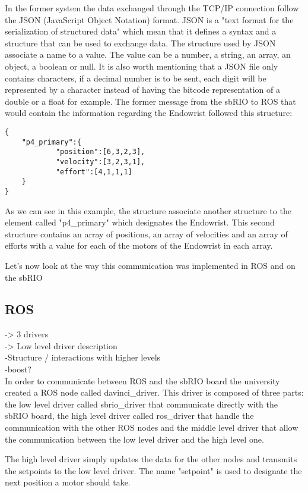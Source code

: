 In the former system the data exchanged through the TCP/IP connection follow the JSON (JavaScript Object Notation) format. JSON is a "text format for the serialization of structured data"\cite{JSON} which mean that it defines a syntax and a structure that can be used to exchange data. The structure used by JSON associate a name to a value. The value can be a number, a string, an array, an object, a boolean or null. It is also worth mentioning that a JSON file only contains characters, if a decimal number is to be sent, each digit will be represented by a character instead of having the bitcode representation of a double or a float for example. The former message from the sbRIO to ROS that would contain the information regarding the Endowrist followed this structure:

\begin{verbatim}
{
	"p4_primary":{
			"position":[6,3,2,3],
			"velocity":[3,2,3,1],
			"effort":[4,1,1,1]
	}
}
\end{verbatim}

As we can see in this example, the structure associate another structure to the element called "p4\_primary" which designates the Endowrist. This second structure contains an array of positions, an array of velocities and an array of efforts with a value for each of the motors of the Endowrist in each array.

Let's now look at the way this communication was implemented in ROS and on the sbRIO
\subsection{ROS}
-> 3 drivers\\
-> Low level driver description\\
	-Structure / interactions with higher levels\\
	-boost?\\

In order to communicate between ROS and the sbRIO board the university created a ROS node called davinci\_driver. This driver is composed of three parts: the low level driver called sbrio\_driver that communicate directly with the sbRIO board, the high level driver called ros\_driver that handle the communication with the other ROS nodes and the middle level driver that allow the communication between the low level driver and the high level one.


The high level driver simply updates the data for the other nodes and transmits the setpoints to the low level driver. The name "setpoint" is used to designate the next position a motor should take.

